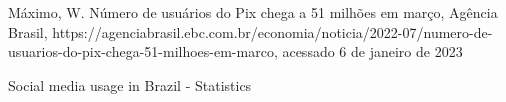 \documentclass[
12pt,		%
openright,	%
twoside,  %
a4paper,			%
chapter=TITLE,		%
english,			%
french,				%
spanish,			%
brazil				%
]{USPSC-classe/USPSC}
\begin{document}
\begin{flushleft}
\begin{flushleft}
\begin{flushleft}
\begin{flushleft}
\begin{flushleft}
\begin{flushleft}
\begin{flushleft}
\begin{flushleft}
[M\'aximo, 2022] M\'aximo, W. N\'umero de usu\'arios do Pix chega a 51 milh\~oes em mar\c{c}o, Ag\^encia Brasil, https://agenciabrasil.ebc.com.br/economia/noticia/2022-07/numero-de-usuarios-do-pix-chega-51-milhoes-em-marco, acessado 6 de janeiro de 2023
\end{flushleft}


\end{flushleft}


\end{flushleft}


\end{flushleft}


\end{flushleft}


\end{flushleft}


\end{flushleft}


\end{flushleft}


\begin{flushleft}
\begin{flushleft}
\begin{flushleft}
\begin{flushleft}
\begin{flushleft}
\begin{flushleft}
\begin{flushleft}
\begin{flushleft}
[STATISTA, 2022] \textquotedbl Social media usage in Brazil - Statistics 
\end{flushleft}


\end{flushleft}


\end{flushleft}


\end{flushleft}


\end{flushleft}


\end{flushleft}


\end{flushleft}


\end{flushleft}
\end{document}
